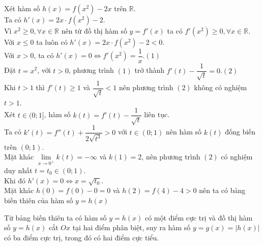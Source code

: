 \begin{Solbook}{18}
 \par \noindent  Xét hàm số $h(x)=f(x^2)-2x$ trên $\mathbb {R}$.\\ Ta có $h'(x)=2x\cdot f(x^2)-2$.\\ Vì $x^2\ge 0,\forall x\in \mathbb {R}$ nên từ đồ thị hàm số $y=f'(x)$ ta có $f'(x^2) \ge 0,\forall x\in \mathbb {R}$.\\ Với $x\le 0$ ta luôn có $h'(x)=2x\cdot f(x^2)-2<0$.\\ Với $x>0$, ta có $h'(x)=0\Leftrightarrow f'(x^2)=\dfrac {1}{x}$.\qquad $(1)$\\ Đặt $t=x^2$, với $t>0$, phương trình $(1)$ trở thành $f'(t)-\dfrac {1}{\sqrt {t}}=0$.\qquad $(2)$\\ Khi $t> 1$ thì $f'(t)\ge 1$ và $\dfrac {1}{\sqrt {t}}<1$ nên phương trình $(2)$ không có nghiệm $t>1$.\\ Xét $t\in (0;1]$, hàm số $k(t)=f'(t)-\dfrac {1}{\sqrt {t}}$ liên tục.\\ Ta có $k'(t)=f''(t)+\dfrac {1}{2\sqrt {t^3}}>0$ với $t\in (0;1)$ nên hàm số $k(t)$ đống biến trên $(0;1)$.\\ Mặt khác $\lim \limits _{x\to 0^+}k(t)=-\infty $ và $k(1)=2$, nên phương trình $(2)$ có nghiệm duy nhất $t=t_0\in (0;1)$.\\ Khi đó $h'(x)=0\Leftrightarrow x=\sqrt {t_0}$.\\ Mặt khác $h(0)=f(0)-0=0$ và $h(2)=f(4)-4>0$ nên ta có bảng biến thiên của hàm số $y=h(x)$ \begin {center}  \end {center} Từ bảng biến thiên ta có hàm số $y=h(x)$ có một điểm cực trị và đồ thị hàm số $y=h(x)$ cắt $Ox$ tại hai điểm phân biệt, suy ra hàm số $y=g(x)=\left |h(x)\right |$ có ba điểm cực trị, trong đó có hai điểm cực tiểu.  \par \noindent \selectB \hfill \qedEX 
\end{Solbook}
